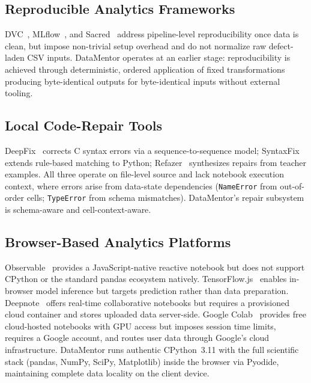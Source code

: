 \documentclass[conference]{IEEEtran}
\begin{document}
\subsection{Reproducible Analytics Frameworks}

DVC~\cite{dvc2020}, MLflow~\cite{mlflow2018}, and Sacred~\cite{sacred2017}
address pipeline-level reproducibility once data is clean, but impose
non-trivial setup overhead and do not normalize raw defect-laden CSV
inputs. DataMentor operates at an earlier stage: reproducibility is
achieved through deterministic, ordered application of fixed
transformations producing byte-identical outputs for byte-identical
inputs without external tooling.

\subsection{Local Code-Repair Tools}

DeepFix~\cite{deepfix2017} corrects C syntax errors via a
sequence-to-sequence model; SyntaxFix~\cite{syntaxfix2021} extends
rule-based matching to Python; Refazer~\cite{refazer2016} synthesizes
repairs from teacher examples. All three operate on file-level source
and lack notebook execution context, where errors arise from data-state
dependencies (\texttt{NameError} from out-of-order cells;
\texttt{TypeError} from schema mismatches). DataMentor's repair
subsystem is schema-aware and cell-context-aware.

\subsection{Browser-Based Analytics Platforms}

Observable~\cite{observable2021} provides a JavaScript-native reactive
notebook but does not support CPython or the standard pandas ecosystem
natively. TensorFlow.js~\cite{tensorflowjs2019} enables in-browser
model inference but targets prediction rather than data preparation.
Deepnote~\cite{deepnote2022} offers real-time collaborative notebooks
but requires a provisioned cloud container and stores uploaded data
server-side. Google Colab~\cite{colab2019} provides free cloud-hosted
notebooks with GPU access but imposes session time limits, requires a
Google account, and routes user data through Google's cloud infrastructure.
DataMentor runs authentic CPython~3.11 with the full scientific stack
(pandas, NumPy, SciPy, Matplotlib) inside the browser via Pyodide,
maintaining complete data locality on the client device.
\end{document}
